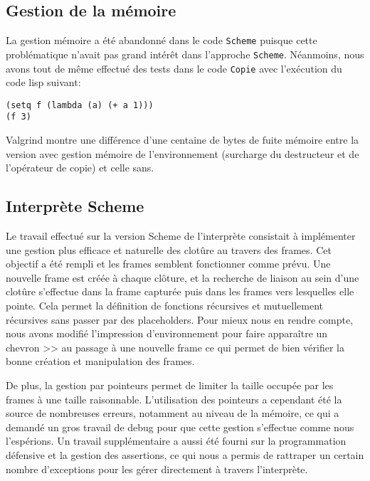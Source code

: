 \documentclass[a4paper,11pt]{article}
\begin{document}
\subsection{Gestion de la mémoire}

La gestion mémoire a été abandonné dans le code \texttt{Scheme} puisque cette 
problématique n'avait pas grand intérêt dans l'approche \texttt{Scheme}. Néanmoins,
nous avons tout de même effectué des tests dans le code \texttt{Copie} avec
l'exécution du
code lisp suivant:

\begin{lstlisting}
(setq f (lambda (a) (+ a 1)))
(f 3)
\end{lstlisting}

Valgrind montre une différence d'une centaine de bytes de fuite mémoire entre la version avec
gestion mémoire de l'environnement (surcharge du destructeur et de l'opérateur
de copie) et celle sans.

 \subsection{Interprète Scheme}

 Le travail effectué sur la version Scheme de l'interprète consistait à implémenter 
 une gestion plus efficace et naturelle des clotûre au travers des frames. Cet 
 objectif a été rempli et les frames semblent fonctionner comme prévu. Une nouvelle
 frame est créée à chaque clôture, et la recherche de liaison au sein d'une clotûre 
 s'effectue dans la frame capturée puis dans les frames vers lesquelles elle pointe. 
 Cela permet la définition de fonctions récursives et mutuellement récursives sans 
 passer par des placeholders. Pour mieux nous en rendre compte, nous avons
 modifié l'impression d'environnement pour faire apparaître un chevron >> au
 passage à une nouvelle frame ce qui permet de bien vérifier la bonne création
 et manipulation des frames.
 
 De plus, la gestion par pointeurs permet de limiter la taille occupée par les frames 
 à une taille raisonnable. L'utilisation des pointeurs a cependant été la source de 
 nombreuses erreurs, notamment au niveau de la mémoire, ce qui a demandé un gros 
 travail de debug pour que cette gestion s'effectue comme nous l'espérions. Un travail 
 supplémentaire a aussi été fourni sur la programmation défensive et la gestion des
 assertions, ce qui nous a permis de rattraper un certain nombre d'exceptions pour les 
 gérer directement à travers l'interprète.
\end{document}
